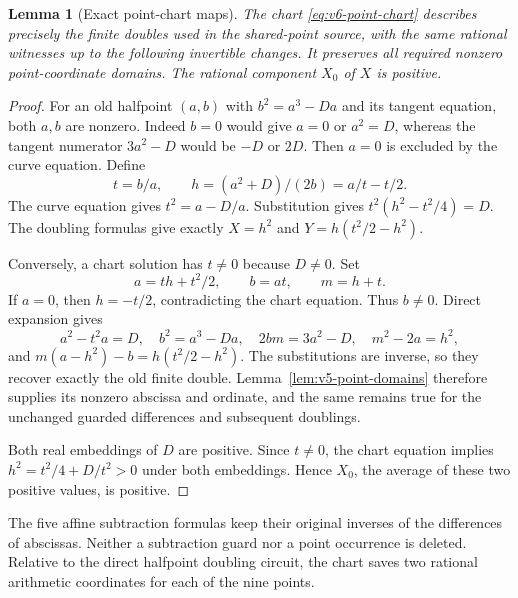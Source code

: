\documentclass[11pt]{article}
\newtheorem{lemma}[theorem]{Lemma}
\theoremstyle{definition}
\theoremstyle{remark}
\begin{document}
\begin{lemma}[Exact point-chart maps]\label{lem:v6-point-chart}
The chart \eqref{eq:v6-point-chart} describes precisely the finite doubles
used in the shared-point source, with the same rational witnesses up to
the following invertible changes. It preserves all required nonzero
point-coordinate domains. The rational component $X_0$ of $X$ is positive.
\end{lemma}
\begin{proof}
For an old halfpoint $(a,b)$ with $b^2=a^3-Da$ and its tangent equation,
both $a,b$ are nonzero. Indeed $b=0$ would give $a=0$ or $a^2=D$,
whereas the tangent numerator $3a^2-D$ would be $-D$ or $2D$. Then
$a=0$ is excluded by the curve equation. Define
\[
 t=b/a,\qquad h=(a^2+D)/(2b)=a/t-t/2.
\]
The curve equation gives $t^2=a-D/a$. Substitution gives
$t^2(h^2-t^2/4)=D$. The doubling formulas give exactly $X=h^2$
and $Y=h(t^2/2-h^2)$.

Conversely, a chart solution has $t\ne0$ because $D\ne0$. Set
\[
 a=th+t^2/2,\qquad b=at,\qquad m=h+t.
\]
If $a=0$, then $h=-t/2$, contradicting the chart equation. Thus $b\ne0$.
Direct expansion gives
\[
 a^2-t^2a=D,\quad b^2=a^3-Da,\quad
 2bm=3a^2-D,\quad m^2-2a=h^2,
\]
and $m(a-h^2)-b=h(t^2/2-h^2)$. The substitutions are inverse, so they
recover exactly the old finite double. Lemma~\ref{lem:v5-point-domains}
therefore supplies its nonzero abscissa and ordinate, and the same remains
true for the unchanged guarded differences and subsequent doublings.

Both real embeddings of $D$ are positive. Since $t\ne0$, the chart
equation implies $h^2=t^2/4+D/t^2>0$ under both embeddings. Hence
$X_0$, the average of these two positive values, is positive.
\end{proof}

The five affine subtraction formulas keep their original inverses of
the differences of abscissas. Neither a subtraction guard nor a point
occurrence is deleted. Relative to the direct halfpoint doubling circuit,
the chart saves two rational arithmetic coordinates for each of the nine
points.
\end{document}
